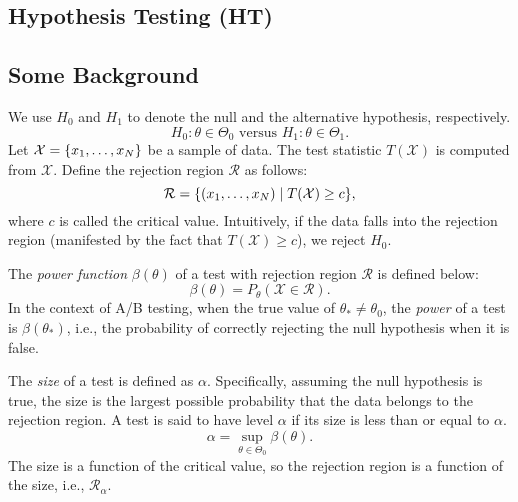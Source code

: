 \subsection{Hypothesis Testing (HT)}
    \subsection{Some Background}
        We use $H_0$ and $H_1$ to denote the null and the alternative hypothesis, respectively.
            \begin{equation}
                H_0: \theta \in  \Theta_0 \text{ versus } H_1: \theta \in \Theta_1. 
            \end{equation}
        Let $\mathcal{X} = \{ x_1, \ldots, x_N \}$  be a sample of data.
        The test statistic $T(\mathcal{X})$ is computed from $\mathcal{X}$.
        Define the rejection region $\mathcal{R}$ as follows:
            \begin{equation}
                \mathcal{R}  = \{ (x_1, \ldots, x_N) \mid T(\mathcal{X}) \ge c \},
            \end{equation}
        where $c$ is called the critical value.
        Intuitively, if the data falls into the rejection region (manifested by the fact that $T(\mathcal{X}) \ge c$), we reject $H_0$.

        The \emph{power function} $\beta(\theta)$ of a test with rejection region $\mathcal{R}$ is defined below:
            \begin{equation}
                \beta(\theta) = P_\theta(\mathcal{X} \in \mathcal{R}).
            \end{equation}
        In the context of A/B testing, when the true value of $\theta_\ast \ne \theta_0$, the \emph{power} of a test is $\beta(\theta_\ast)$, i.e., the probability of correctly rejecting the null hypothesis when it is false.
        
        The \emph{size}  of a test is defined as $\alpha$. 
        Specifically, assuming the null hypothesis is true, the size is the largest possible probability that the data belongs to the rejection region.  
        A test is said to have level $\alpha$ if its size is less than or equal to $\alpha$.
            \begin{equation}
                \alpha  = \sup_{\theta \in \Theta_0} \beta(\theta).
            \end{equation}
        The size is a function of the critical value, so the rejection region is a function of the size, i.e., $\mathcal{R}_\alpha$.

